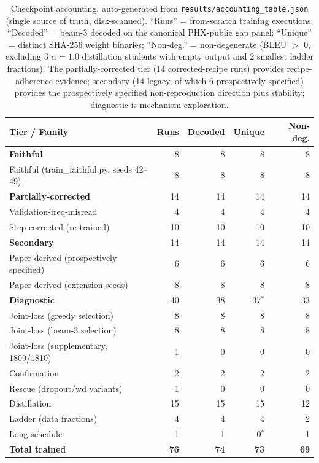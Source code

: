 \documentclass[pdflatex,sn-chicago]{sn-jnl}
\begin{document}
\begin{table}[h]
\centering
\scriptsize\setlength{\tabcolsep}{3pt}
\caption{Checkpoint accounting, auto-generated from \texttt{results/accounting\_table.json} (single source of truth, disk-scanned). ``Runs'' = from-scratch training executions; ``Decoded'' = beam-3 decoded on the canonical PHX-public gap panel; ``Unique'' = distinct SHA-256 weight binaries; ``Non-deg.'' = non-degenerate (BLEU $>$ 0, excluding 3 $\alpha{=}1.0$ distillation students with empty output and 2 smallest ladder fractions). The partially-corrected tier (14 corrected-recipe runs) provides recipe-adherence evidence; secondary (14 legacy, of which 6 prospectively specified) provides the prospectively specified non-reproduction direction plus stability; diagnostic is mechanism exploration.}
\label{tab:accounting}
\begin{tabular}{p{2.8cm}rrrr}
\toprule
Tier / Family & Runs & Decoded & Unique & Non-deg. \\
\midrule
\textbf{Faithful} & 8 & 8 & 8 & 8 \\
\quad Faithful (train\_faithful.py, seeds 42--49) & 8 & 8 & 8 & 8 \\
\textbf{Partially-corrected} & 14 & 14 & 14 & 14 \\
\quad Validation-freq-misread & 4 & 4 & 4 & 4 \\
\quad Step-corrected (re-trained) & 10 & 10 & 10 & 10 \\
\textbf{Secondary} & 14 & 14 & 14 & 14 \\
\quad Paper-derived (prospectively specified) & 6 & 6 & 6 & 6 \\
\quad Paper-derived (extension seeds) & 8 & 8 & 8 & 8 \\
\textbf{Diagnostic} & 40 & 38 & 37$^*$ & 33 \\
\quad Joint-loss (greedy selection) & 8 & 8 & 8 & 8 \\
\quad Joint-loss (beam-3 selection) & 8 & 8 & 8 & 8 \\
\quad Joint-loss (supplementary, 1809/1810) & 1 & 0 & 0 & 0 \\
\quad Confirmation & 2 & 2 & 2 & 2 \\
\quad Rescue (dropout/wd variants) & 1 & 0 & 0 & 0 \\
\quad Distillation & 15 & 15 & 15 & 12 \\
\quad Ladder (data fractions) & 4 & 4 & 4 & 2 \\
\quad Long-schedule & 1 & 1 & 0$^*$ & 1 \\
\midrule
\textbf{Total trained} & \textbf{76} & \textbf{74} & \textbf{73} & \textbf{69} \\

\end{tabular}
\end{table}
\end{document}
